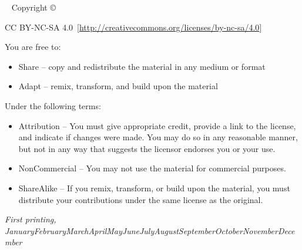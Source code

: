 \documentclass{tufte-book} %
\theoremstyle{definition}
\theoremstyle{example}
\theoremstyle{theorem}
\newcommand{\monthyear}{\ifcase\month\or January\or February\or March\or April\or May\or June\or July\or August\or September\or October\or November\or December\fi\space\number\year} %
\begin{document}
\newpage
\begin{fullwidth}
~\vfill
\thispagestyle{empty}
\setlength{\parindent}{0pt}
\setlength{\parskip}{\baselineskip}
Copyright \copyright\ \the\year\ \thanklessauthor

\par{}

\par{}

\par CC BY-NC-SA 4.0\ [\url{http://creativecommons.org/licenses/by-nc-sa/4.0}]

You are free to:
\begin{itemize}
    \item Share -- copy and redistribute the material in any medium or format
    \item Adapt -- remix, transform, and build upon the material
\end{itemize}
Under the following terms:
\begin{itemize}
\item Attribution -- You must give appropriate credit, provide a link to the license, and indicate if changes were made. You may do so in any reasonable manner, but not in any way that suggests the licensor endorses you or your use.
\item NonCommercial -- You may not use the material for commercial purposes.
\item ShareAlike -- If you remix, transform, or build upon the material, you must distribute your contributions under the same license as the original. 
\end{itemize}

\par\textit{First printing, \monthyear}
\end{fullwidth}


\tableofcontents %


\listoffigures %


\listoftables %
\end{document}
